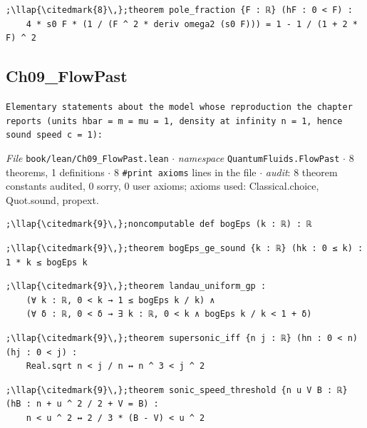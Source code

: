 \begin{lstlisting}[style=leancat]
;\llap{\citedmark{8}\,};theorem pole_fraction {F : ℝ} (hF : 0 < F) :
    4 * s0 F * (1 / (F ^ 2 * deriv omega2 (s0 F))) = 1 - 1 / (1 + 2 * F) ^ 2
\end{lstlisting}

\subsection{Ch09\_\allowbreak{}FlowPast}
{\footnotesize\raggedright\texttt{Elementary statements about the model whose reproduction the chapter reports (units hbar = m = mu = 1,\allowbreak{} density at infinity n = 1,\allowbreak{} hence sound speed c = 1):}\par}
{\footnotesize\raggedright\emph{File} \texttt{book/lean/Ch09\_\allowbreak{}FlowPast.\allowbreak{}lean} $\cdot$ \emph{namespace} \texttt{QuantumFluids.\allowbreak{}FlowPast} $\cdot$ 8 theorems, 1 definitions $\cdot$ 8 \texttt{\#print axioms} lines in the file $\cdot$ \emph{audit}: 8 theorem constants audited, 0 sorry, 0 user axioms; axioms used: Classical.choice, Quot.sound, propext.\par}
\begin{lstlisting}[style=leancat]
;\llap{\citedmark{9}\,};noncomputable def bogEps (k : ℝ) : ℝ
\end{lstlisting}

\begin{lstlisting}[style=leancat]
;\llap{\citedmark{9}\,};theorem bogEps_ge_sound {k : ℝ} (hk : 0 ≤ k) : 1 * k ≤ bogEps k
\end{lstlisting}

\begin{lstlisting}[style=leancat]
;\llap{\citedmark{9}\,};theorem landau_uniform_gp :
    (∀ k : ℝ, 0 < k → 1 ≤ bogEps k / k) ∧
    (∀ δ : ℝ, 0 < δ → ∃ k : ℝ, 0 < k ∧ bogEps k / k < 1 + δ)
\end{lstlisting}

\begin{lstlisting}[style=leancat]
;\llap{\citedmark{9}\,};theorem supersonic_iff {n j : ℝ} (hn : 0 < n) (hj : 0 < j) :
    Real.sqrt n < j / n ↔ n ^ 3 < j ^ 2
\end{lstlisting}

\begin{lstlisting}[style=leancat]
;\llap{\citedmark{9}\,};theorem sonic_speed_threshold {n u V B : ℝ} (hB : n + u ^ 2 / 2 + V = B) :
    n < u ^ 2 ↔ 2 / 3 * (B - V) < u ^ 2
\end{lstlisting}

